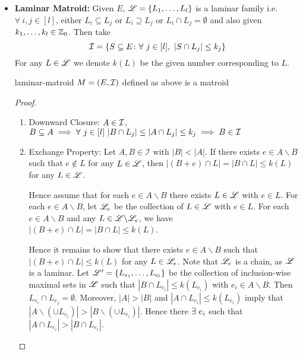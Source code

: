 \begin{itemize}[label=$\bullet$]
\begin{proof}
\begin{enumerate}[label=\bfseries\tiny\protect\circled{\small\arabic*}]
	\end{enumerate}Therefore $M$ is a matroid
\end{proof}
\item \textbf{Laminar Matroid:} Given $E$, ${\mathscr{L}}=\{L_1,\dots,L_l\}$ is a laminar family i.e. $\forall\ i,j\in [l]$, either $L_i\subseteq L_j$ or $L_i\supseteq L_j$ or $L_i\cap L_j=\emptyset$ and also given $k_1,\dots, k_l\in \mathbb{Z}_0$. Then take $$\mathcal{I}=\{S\subseteq E\colon \forall \ j\in[l],\ |S\cap L_j|\leq k_j\}$$For any $L\in{\mathscr{L}}$ we denote $k(L)$ be the given number corresponding to $L$.
\begin{lemma}{}{laminar-matroid}
	$M=(E,\mathcal{I})$ defined as above is a matroid
\end{lemma}
\begin{proof}
	\begin{enumerate}[label=\bfseries\tiny\protect\circled{\small\arabic*}]
		\item Downward Closure: $A\in \mathcal{I}$, $B\subseteq A\implies \forall\ j\in[l]\ |B\cap L_j|\leq |A\cap L_j|\leq k_j\implies B\in \mathcal{I}$
		\item Exchange Property: \parinn Let $A,B\in \mathcal{I}$ with $|B|<|A|$.	If there exists $e\in A\backslash B$ such that $e\notin L$ for any $L\in{\mathscr{L}}$, then $|(B+e)\cap L|=|B\cap L|\leq k(L)$ for any $L\in{\mathscr{L}}$.
		
		Hence assume that for each $e\in A\backslash B$ there exists $L\in{\mathscr{L}}$ with $e\in L$.
		For each $e\in A\backslash B$, let ${\mathscr{L}}_e$ be the collection of $L\in{\mathscr{L}}$ with $e\in L$.
		For each $e\in A\backslash B$ and any $L\in{\mathscr{L}}\backslash{\mathscr{L}}_e$, we have $|(B+e)\cap L|=|B\cap L|\leq k(L)$.
		
		Hence it remains to show that there exists $e\in A\backslash B$ such that $|(B+e)\cap L|\leq k(L)$ for any $L\in{\mathscr{L}}_e$.
		Note that ${\mathscr{L}}_e$ is a chain, as ${\mathscr{L}}$ is a laminar.
		Let ${\mathscr{L}}'=\{L_{e_1},\ldots,L_{e_l}\}$ be the collection of inclusion-wise maximal sets in ${\mathscr{L}}$ such that $|B\cap L_{e_i}|\leq k(L_{e_i})$ with $e_i\in A\backslash B$.
		Then $L_{e_i}\cap L_{e_j}=\emptyset$. Moreover, $|A|>|B|$ and $|A\cap L_{e_i}|\leq k(L_{e_i})$ imply that $|A\backslash (\cup L_{e_i})|>|B\backslash (\cup L_{e_i})|$. Hence there $\exists\ e_i$ such that $|A\cap L_{e_i}|>|B\cap L_{e_i}|$.
		

\end{enumerate}
\end{proof}
\end{itemize}
